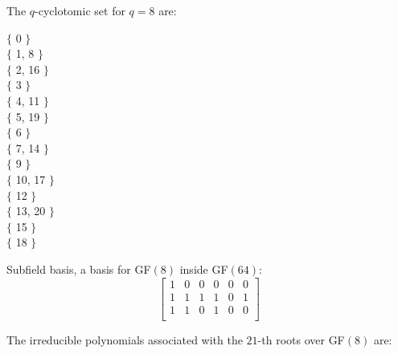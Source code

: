 \noindent The $q$-cyclotomic set for $q=8$ are:

\noindent $\{$ 0 $\}$\\
$\{$ 1, 8 $\}$\\
$\{$ 2, 16 $\}$\\
$\{$ 3 $\}$\\
$\{$ 4, 11 $\}$\\
$\{$ 5, 19 $\}$\\
$\{$ 6 $\}$\\
$\{$ 7, 14 $\}$\\
$\{$ 9 $\}$\\
$\{$ 10, 17 $\}$\\
$\{$ 12 $\}$\\
$\{$ 13, 20 $\}$\\
$\{$ 15 $\}$\\
$\{$ 18 $\}$\\
\bigskip

Subfield basis, a basis for GF$(8)$ inside GF$(64)$:
$$
\left[
\begin{array}{*{6}{c}}
1 & 0 & 0 & 0 & 0 & 0\\
1 & 1 & 1 & 1 & 0 & 1\\
1 & 1 & 0 & 1 & 0 & 0\\
\end{array}
\right]
$$
\bigskip

The irreducible polynomials associated with the $21$-th roots over GF$(8)$ are:

\bigskip



